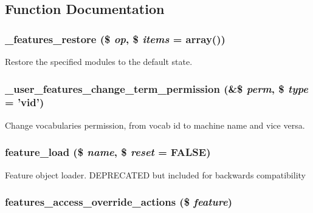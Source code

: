 \subsection{Function Documentation}
\hypertarget{features_8module_a0298400d481d56cee72177e00c1777cd}{
\subsubsection[{\_\-features\_\-restore}]{\setlength{\rightskip}{0pt plus 5cm}\_\-features\_\-restore (\$ {\em op}, \/  \$ {\em items} = {\ttfamily array()})}}
\label{features_8module_a0298400d481d56cee72177e00c1777cd}
Restore the specified modules to the default state. \hypertarget{features_8module_a2ce08ffe8a095c32656f9f78c2bb9ac5}{
\subsubsection[{\_\-user\_\-features\_\-change\_\-term\_\-permission}]{\setlength{\rightskip}{0pt plus 5cm}\_\-user\_\-features\_\-change\_\-term\_\-permission (\&\$ {\em perm}, \/  \$ {\em type} = {\ttfamily 'vid'})}}
\label{features_8module_a2ce08ffe8a095c32656f9f78c2bb9ac5}
Change vocabularies permission, from vocab id to machine name and vice versa. \hypertarget{features_8module_ac4d9735b1a5fade78f7e1ac2a8115196}{
\subsubsection[{feature\_\-load}]{\setlength{\rightskip}{0pt plus 5cm}feature\_\-load (\$ {\em name}, \/  \$ {\em reset} = {\ttfamily FALSE})}}
\label{features_8module_ac4d9735b1a5fade78f7e1ac2a8115196}
Feature object loader. DEPRECATED but included for backwards compatibility \hypertarget{features_8module_aeb1b6b9ab9beb2e78552c06cc86a241c}{
\subsubsection[{features\_\-access\_\-override\_\-actions}]{\setlength{\rightskip}{0pt plus 5cm}features\_\-access\_\-override\_\-actions (\$ {\em feature})}}
